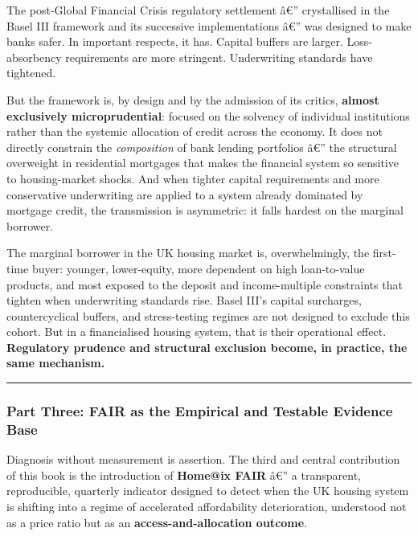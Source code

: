 The post-Global Financial Crisis regulatory settlement â€'' crystallised
in the Basel III framework and its successive implementations â€'' was
designed to make banks safer. In important respects, it has. Capital
buffers are larger. Loss-absorbency requirements are more stringent.
Underwriting standards have tightened.

But the framework is, by design and by the admission of its critics,
\textbf{almost exclusively microprudential}: focused on the solvency of
individual institutions rather than the systemic allocation of credit
across the economy. It does not directly constrain the
\emph{composition} of bank lending portfolios â€'' the structural
overweight in residential mortgages that makes the financial system so
sensitive to housing-market shocks. And when tighter capital
requirements and more conservative underwriting are applied to a system
already dominated by mortgage credit, the transmission is asymmetric: it
falls hardest on the marginal borrower.

The marginal borrower in the UK housing market is, overwhelmingly, the
first-time buyer: younger, lower-equity, more dependent on high
loan-to-value products, and most exposed to the deposit and
income-multiple constraints that tighten when underwriting standards
rise. Basel III's capital surcharges, countercyclical buffers, and
stress-testing regimes are not designed to exclude this cohort. But in a
financialised housing system, that is their operational effect.
\textbf{Regulatory prudence and structural exclusion become, in
practice, the same mechanism.}

\begin{center}\rule{0.5\linewidth}{0.5pt}\end{center}

\subsubsection{Part Three: FAIR as the Empirical and Testable Evidence
Base}\label{part-three-fair-as-the-empirical-and-testable-evidence-base}

Diagnosis without measurement is assertion. The third and central
contribution of this book is the introduction of \textbf{Home@ix FAIR}
â€'' a transparent, reproducible, quarterly indicator designed to detect
when the UK housing system is shifting into a regime of accelerated
affordability deterioration, understood not as a price ratio but as an
\textbf{access-and-allocation outcome}.

